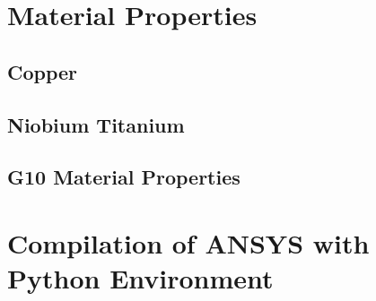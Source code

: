 \documentclass{article}
\begin{document}
\clearpage
\begin{appendices}

\section{Material Properties}
\label{appendix_material_properties_description}


\subsection{Copper}
\label{appendix:cu_material_properties}


\subsection{Niobium Titanium}
\label{appendix:nbti_material_properties}


\subsection{G10 Material Properties}
\label{appendix:g10_material_properties}


\clearpage
\section{Compilation of ANSYS with Python Environment}
\label{appendix:python_ansys_compilation}



\end{appendices}

\clearpage


\end{document}
